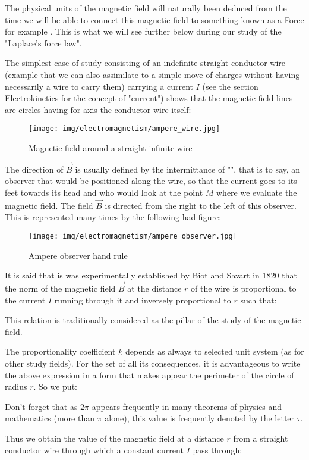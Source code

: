 	The physical units of the magnetic field will naturally been deduced from the time we will be able to connect this magnetic field to something known as a Force for example . This is what we will see further below during our study of the "Laplace's force law".
	
	The simplest case of study consisting of an indefinite straight conductor wire (example that we can also assimilate to a simple move of charges without having necessarily a wire to carry them) carrying a current $I$ (see the section Electrokinetics for the concept of "current") shows that the magnetic field lines are circles having for axis the conductor wire itself:
	\begin{figure}[H]
		\centering
		\texttt{[image: img/electromagnetism/ampere\_wire.jpg]}
		\caption{Magnetic field around a straight infinite wire}
	\end{figure}
	The direction of $\vec{B}$ is usually defined by the intermittance of "", that is to say, an observer that would be positioned along the wire, so that the current goes to its feet towards its head and who would look at the point $M$ where we evaluate the magnetic field. The field $\vec{B}$ is directed from the right to the left of this observer. This is represented many times by the following had figure:
	\begin{figure}[H]
		\centering
		\texttt{[image: img/electromagnetism/ampere\_observer.jpg]}
		\caption{Ampere observer hand rule}
	\end{figure}
	It is said that is was experimentally established by Biot and Savart in 1820 that the norm of the magnetic field $\vec{B}$ at the distance $r$ of the wire is proportional to the current $I$ running through it and inversely proportional to $r$ such that:
	
	This relation is traditionally considered as the pillar of the study of the magnetic field.
	
	The proportionality coefficient $k$ depends as always to selected unit system (as for other study fields). For the set of all its consequences, it is advantageous to write the above expression in a form that makes appear the perimeter of the circle of radius $r$. So we put:
	
	\begin{tcolorbox}[title=Remark,colframe=black,arc=10pt]
	Don't forget that as $2\pi$ appears frequently in many theorems of physics and mathematics (more than $\pi$ alone), this value is frequently denoted by the letter $\tau$.
	\end{tcolorbox}
	Thus we obtain the value of the magnetic field at a distance $r$ from a straight conductor wire through which a constant current $I$ pass through:
	
